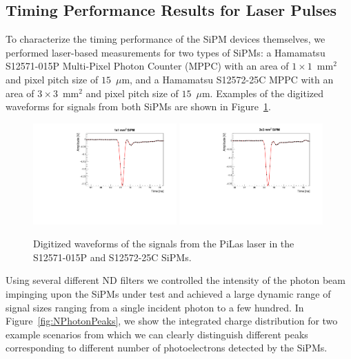 \subsection{Timing Performance Results for Laser Pulses}
\label{sec:lasertiming}

To characterize the timing performance of the SiPM devices themselves, we
performed laser-based measurements for two types of SiPMs: a Hamamatsu
S12571-015P Multi-Pixel Photon Counter (MPPC) with an area of $1\times
1$~$\mathrm{mm}^{2}$ and pixel pitch size of $15$~$\mu$m, and a Hamamatsu
S12572-25C MPPC with an area of $3\times 3$~$\mathrm{mm}^{2}$ and pixel pitch
size of $15$~$\mu$m. Examples of the digitized waveforms for signals from both
SiPMs are shown in Figure~\ref{fig:pulses}.

\begin{figure}[htbp] 
\centering
\includegraphics[width=0.49\textwidth]{figures/PulseShapeExample_1x1SiPM.pdf} 
\includegraphics[width=0.49\textwidth]{figures/PulseShapeExample_3x3SiPM.pdf} 
\caption{Digitized waveforms of the signals from the PiLas laser 
in the S12571-015P and S12572-25C SiPMs.} 
\label{fig:pulses} 
\end{figure} 

Using several different ND filters we controlled the intensity of the photon 
beam impinging upon the SiPMs under test and achieved a large dynamic range 
of signal sizes ranging from a single incident photon to a few hundred. In 
Figure~\ref{fig:NPhotonPeaks}, we show the integrated charge distribution
for two example scenarios from which we can clearly distinguish different peaks
corresponding to different number of photoelectrons detected by the SiPMs.

